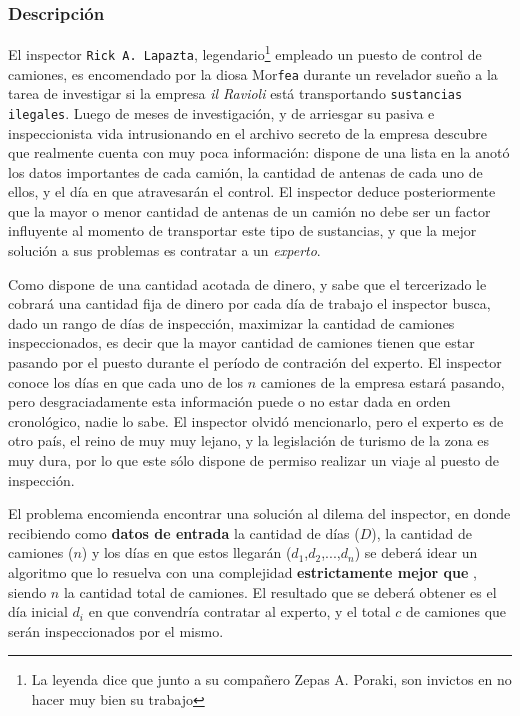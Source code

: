 \documentclass[11pt, a4paper, twoside]{article}
\begin{document}
{}

\subsubsection{Descripción} \label{subsubsec:problema1-descripcion}

El inspector \texttt{Rick A. Lapazta}, legendario\footnote{La leyenda dice que
junto a su compañero Zepas A. Poraki, son invictos en no hacer muy bien su
trabajo} empleado un puesto de control de camiones, es encomendado por la diosa
Mor\texttt{fea} durante un revelador sueño a la tarea de investigar si la
empresa \textit{il Ravioli} está transportando \texttt{sustancias ilegales}.
Luego de meses de investigación, y de arriesgar su pasiva e inspeccionista vida
intrusionando en el archivo secreto de la empresa descubre que realmente cuenta
con muy poca información: dispone de una lista en la anotó los datos importantes
de cada camión, la cantidad de antenas de cada uno de ellos, y el día en que
atravesarán el control. El inspector deduce posteriormente que la mayor o menor
cantidad de antenas de un camión no debe ser un factor influyente al momento de
transportar este tipo de sustancias, y que la mejor solución a sus problemas es
contratar a un \textit{experto}.

Como dispone de una cantidad acotada de dinero, y sabe que el tercerizado le
cobrará una cantidad fija de dinero por cada día de trabajo el inspector busca,
dado un rango de días de inspección, maximizar la cantidad de camiones
inspeccionados, es decir que la mayor cantidad de camiones tienen que estar
pasando por el puesto durante el período de contración del experto. El inspector
conoce los días en que cada uno de los $n$ camiones de la empresa estará
pasando, pero desgraciadamente esta información puede o no estar dada en orden
cronológico, nadie lo sabe. El inspector olvidó mencionarlo, pero el experto es
de otro país, el reino de muy muy lejano, y la legislación de turismo de la zona
es muy dura, por lo que este sólo dispone de permiso realizar un viaje al puesto
de inspección.


El problema encomienda encontrar una solución al dilema del inspector, en donde
recibiendo como \textbf{datos de entrada} la cantidad de días ($D$), la cantidad
de camiones ($n$) y los días en que estos llegarán ($d_1$,$d_2$,...,$d_n$) se
deberá idear un algoritmo que lo resuelva con una complejidad
\textbf{estrictamente mejor que} , siendo $n$ la cantidad total de
camiones. El resultado que se deberá obtener es el día inicial $d_i$ en que
convendría contratar al experto, y el total $c$ de camiones que serán
inspeccionados por el mismo.
\end{document}

